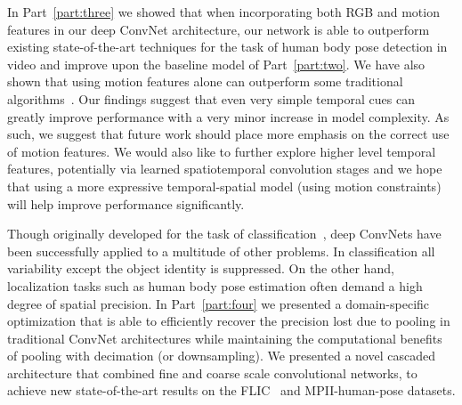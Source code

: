 In Part~\ref{part:three} we showed that when incorporating both RGB and motion features in our deep ConvNet architecture, our network is able to outperform existing state-of-the-art techniques for the task of human body pose detection in video and improve upon the baseline model of Part~\ref{part:two}. We have also shown that using motion features alone can outperform some traditional algorithms~\cite{Eichner:2009:BAM, yang11cvpr, sapp11eccv}. Our findings suggest that even very simple temporal cues can greatly improve performance with a very minor increase in model complexity. As such, we suggest that future work should place more emphasis on the correct use of motion features.  We would also like to further explore higher level temporal features, potentially via learned spatiotemporal convolution stages and we hope that using a more expressive temporal-spatial model (using motion constraints) will help improve performance significantly.

Though originally developed for the task of classification~\cite{LeCunMNIST}, deep ConvNets have been successfully applied to a multitude of other problems. In classification all variability except the object identity is suppressed. On the other hand, localization tasks such as human body pose estimation often demand a high degree of spatial precision. In Part~\ref{part:four} we presented a domain-specific optimization that is able to efficiently recover the precision lost due to pooling in traditional ConvNet architectures while maintaining the computational benefits of pooling with decimation (or downsampling). We presented a novel cascaded architecture that combined fine and coarse scale convolutional networks, to achieve new state-of-the-art results on the FLIC~\cite{modec} and MPII-human-pose\cite{andriluka14cvpr} datasets.
